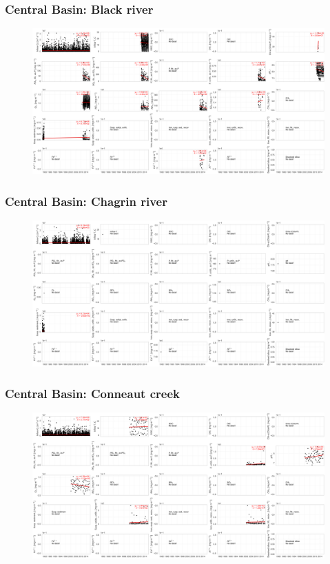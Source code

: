 \documentclass{beamer}
\begin{document}
\begin{frame}
\frametitle{Central Basin: Black river}

\begin{figure}
\includegraphics[width=\textwidth]{rivers/Central basin/blackriver.png}
\end{figure}

\end{frame}

\begin{frame}
\frametitle{Central Basin: Chagrin river}

\begin{figure}
\includegraphics[width=\textwidth]{rivers/Central basin/chagrinriver.png}
\end{figure}

\end{frame}

\begin{frame}
\frametitle{Central Basin: Conneaut creek}

\begin{figure}
\includegraphics[width=\textwidth]{rivers/Central basin/conneautcreek.png}
\end{figure}

\end{frame}
\end{document}
